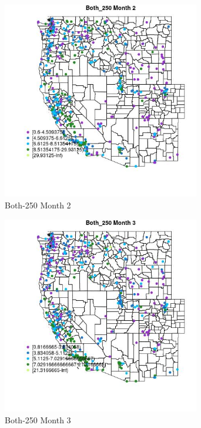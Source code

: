 \begin{figure} 
\centering  
\includegraphics[width=0.77\textwidth]{Code_Outputs/ML_input_report_ML_input_PM25_Step5_part_d_de_duplicated_aves_ML_input_MapObsMo2Both_250.jpg} 
\caption{\label{fig:ML_input_report_ML_input_PM25_Step5_part_d_de_duplicated_aves_ML_inputMapObsMo2Both_250}Both-250 Month 2} 
\end{figure} 
 

\begin{figure} 
\centering  
\includegraphics[width=0.77\textwidth]{Code_Outputs/ML_input_report_ML_input_PM25_Step5_part_d_de_duplicated_aves_ML_input_MapObsMo3Both_250.jpg} 
\caption{\label{fig:ML_input_report_ML_input_PM25_Step5_part_d_de_duplicated_aves_ML_inputMapObsMo3Both_250}Both-250 Month 3} 
\end{figure} 
 

